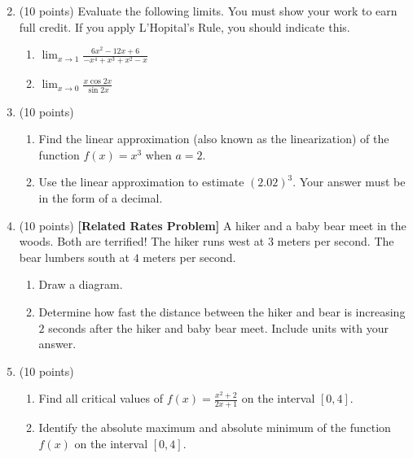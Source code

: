 \documentclass[12pt]{article}
\begin{document}
\begin{enumerate}
\begin{multicols}{2}
\begin{enumerate}
	\end{enumerate}
	\end{multicols}


\pagebreak

\item (10 points) Evaluate the following limits. You must show your work to earn full credit. If you apply L'Hopital's Rule, you should indicate this.
	\begin{enumerate}
	\item $\displaystyle{\lim_{x\to 1} \frac{6x^2-12x+6}{-x^4+x^3+x^2-x}}$
	\vspace{1.5in}
	\item $\displaystyle{\lim_{x\to 0} \frac{x\cos 2x}{\sin 2x}}$
	\vspace{1.5in}
	\end{enumerate}
	
\item (10 points) 
	\begin{enumerate}
	\item Find the linear approximation (also known as the linearization) of the function $f(x)=x^3$ when $a=2.$
	\vfill
	\item Use the linear approximation to estimate $(2.02)^3$. Your answer must be in the form of a decimal.
	\vfill
	\end{enumerate}
\newpage

\item (10 points) \textbf{[Related Rates Problem]} A hiker and a baby bear meet in the woods. Both are terrified! The hiker runs west at $3$ meters per second. The bear lumbers south at $4$ meters per second.
	\begin{enumerate}
	\item Draw a diagram.
	\vspace{2in}
	\item Determine how fast the distance between the hiker and bear is 	increasing  $2$ seconds after the hiker and baby bear meet. Include units with your answer.
	\vspace{2in}
	\end{enumerate}
\newpage
\item (10 points) 
	\begin{enumerate}
	\item Find all critical values of $\displaystyle{f(x)=\frac{x^2+2}{2x+1}}$ on the interval $[0,4]$.
	\vfill
	\item Identify the absolute maximum and absolute minimum of the function $f(x)$ on the interval $[0,4].$
	\vfill


\end{enumerate}
\end{enumerate}
\end{document}

